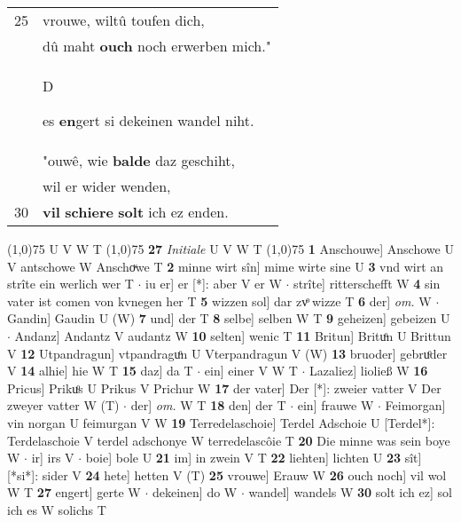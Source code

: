 \documentclass[8pt,a4paper,notitlepage]{article}
\begin{document}
\begin{table}[ht]
\begin{minipage}[t]{0.5\linewidth}
\begin{tabular}{rl}
25 & vrouwe, wiltû toufen dich,\\ 
 & dû maht \textbf{ouch} noch erwerben mich."\\ 
 & \begin{large}D\end{large}es \textbf{en}gert si dekeinen wandel niht.\\ 
 & "ouwê, wie \textbf{balde} daz geschiht,\\ 
 & wil er wider wenden,\\ 
30 & \textbf{vil} \textbf{schiere} \textbf{solt} ich ez enden.\\ 
\end{tabular}
\scriptsize
\line(1,0){75} \newline
U V W T \newline
\line(1,0){75} \newline
\textbf{27} \textit{Initiale} U V W T  \newline
\line(1,0){75} \newline
\textbf{1} Anschouwe] Anschowe U V antschowe W Anschoͮwe T \textbf{2} minne wirt sîn] mime wirte sine U \textbf{3} vnd wirt an strîte ein werlich wer T  $\cdot$ iu er] er [*]: aber V er W  $\cdot$ strîte] ritterschefft W \textbf{4} sin vater ist comen von kvnegen her T \textbf{5} wizzen sol] dar zvͦ wizze T \textbf{6} der] \textit{om.} W  $\cdot$ Gandin] Gaudin U (W) \textbf{7} und] der T \textbf{8} selbe] selben W T \textbf{9} geheizen] gebeizen U  $\cdot$ Andanz] Andantz V audantz W \textbf{10} selten] wenic T \textbf{11} Britun] Brituͦn U Brittun V \textbf{12} Utpandragun] vtpandraguͦn U Vterpandragun V (W) \textbf{13} bruoder] gebruͦder V \textbf{14} alhie] hie W T \textbf{15} daz] da T  $\cdot$ ein] einer V W T  $\cdot$ Lazaliez] lioließ W \textbf{16} Pricus] Prikuͦs U Prikus V Prichur W \textbf{17} der vater] Der [*]: zweier vatter V Der zweyer vatter W (T)  $\cdot$ der] \textit{om.} W T \textbf{18} den] der T  $\cdot$ ein] frauwe W  $\cdot$ Feimorgan] vin norgan U feimurgan V W \textbf{19} Terredelaschoie] Terdel Adschoie U [Terdel*]: Terdelaschoie V terdel adschonye W terredelascôie T \textbf{20} Die minne was sein boye W  $\cdot$ ir] irs V  $\cdot$ boie] bole U \textbf{21} im] in zwein V T \textbf{22} liehten] lichten U \textbf{23} sît] [*si*]: sider V \textbf{24} hete] hetten V (T) \textbf{25} vrouwe] Erauw W \textbf{26} ouch noch] vil wol W T \textbf{27} engert] gerte W  $\cdot$ dekeinen] do W  $\cdot$ wandel] wandels W \textbf{30} solt ich ez] sol ich es W solichs T \newline
\end{minipage}
\end{table}
\end{document}

